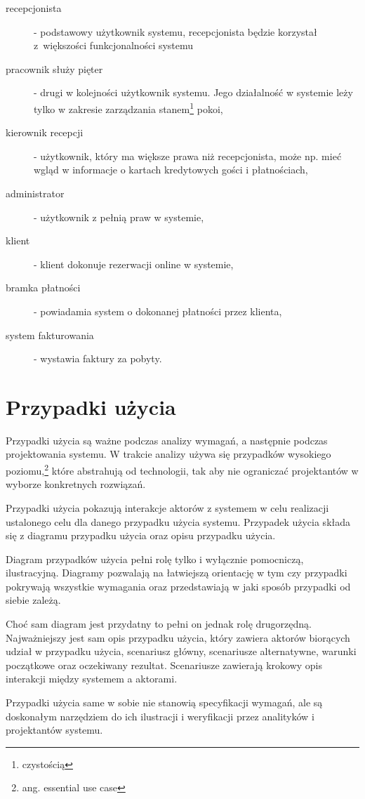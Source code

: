 \documentclass[a4paper,onecolumn,oneside,11pt,wide,floatssmall]{mwrep}
\theoremstyle{definition}
\theoremstyle{plain}%
\theoremstyle{remark}
\begin{document}
\begin{description}
  \item[recepcjonista] - podstawowy użytkownik systemu, recepcjonista będzie korzystał \mbox{z większości} funkcjonalności systemu
  \item[pracownik służy pięter] - drugi w kolejności użytkownik systemu. Jego działalność w systemie leży tylko w zakresie zarządzania stanem\footnote{czystością} pokoi,
  \item[kierownik recepcji] - użytkownik, który ma większe prawa niż recepcjonista, może np. mieć wgląd w informacje o kartach kredytowych gości i płatnościach,
  \item[administrator] - użytkownik z pełnią praw w systemie,
  \item[klient] - klient dokonuje rezerwacji online w systemie,
  \item[bramka płatności] - powiadamia system o dokonanej płatności przez klienta,
  \item[system fakturowania] - wystawia faktury za pobyty.
\end{description}

\section{Przypadki użycia}
Przypadki użycia są ważne podczas analizy wymagań, a następnie podczas projektowania systemu. W trakcie analizy używa się przypadków wysokiego poziomu,\footnote{ang. essential use case} które abstrahują od technologii, tak aby nie ograniczać projektantów w wyborze konkretnych rozwiązań.

Przypadki użycia pokazują interakcje aktorów z systemem w celu realizacji ustalonego celu dla danego przypadku użycia systemu. Przypadek użycia składa się z diagramu przypadku użycia oraz opisu przypadku użycia. 

Diagram przypadków użycia pełni rolę tylko i wyłącznie pomocniczą, ilustracyjną. Diagramy pozwalają na łatwiejszą orientację w tym czy przypadki pokrywają wszystkie wymagania oraz przedstawiają w jaki sposób przypadki od siebie zależą.

Choć sam diagram jest przydatny to pełni on jednak rolę drugorzędną. Najważniejszy jest sam opis przypadku użycia, który zawiera aktorów biorących udział w przypadku użycia, scenariusz główny, scenariusze alternatywne, warunki początkowe oraz oczekiwany rezultat. Scenariusze zawierają krokowy opis interakcji między systemem a aktorami.

Przypadki użycia same w sobie nie stanowią specyfikacji wymagań, ale są doskonałym narzędziem do ich ilustracji i weryfikacji przez analityków i projektantów systemu.
\end{document}
